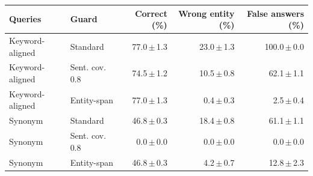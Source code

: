 \begin{tabular}{llrrr}
\toprule
Queries & Guard & Correct (\%) & Wrong entity (\%) & False answers (\%)\\
\midrule
Keyword-aligned & Standard & 77.0\,$\pm$\,1.3 & 23.0\,$\pm$\,1.3 & 100.0\,$\pm$\,0.0\\
Keyword-aligned & Sent. cov. 0.8 & 74.5\,$\pm$\,1.2 & 10.5\,$\pm$\,0.8 & 62.1\,$\pm$\,1.1\\
Keyword-aligned & Entity-span & 77.0\,$\pm$\,1.3 & 0.4\,$\pm$\,0.3 & 2.5\,$\pm$\,0.4\\
Synonym & Standard & 46.8\,$\pm$\,0.3 & 18.4\,$\pm$\,0.8 & 61.1\,$\pm$\,1.1\\
Synonym & Sent. cov. 0.8 & 0.0\,$\pm$\,0.0 & 0.0\,$\pm$\,0.0 & 0.0\,$\pm$\,0.0\\
Synonym & Entity-span & 46.8\,$\pm$\,0.3 & 4.2\,$\pm$\,0.7 & 12.8\,$\pm$\,2.3\\
\bottomrule
\end{tabular}
